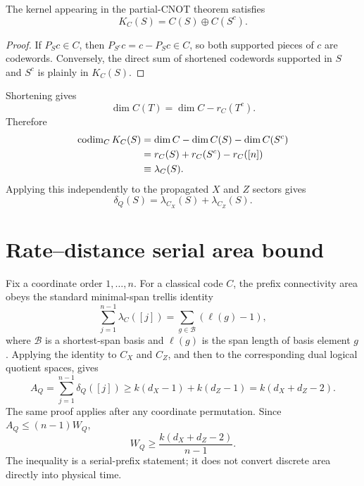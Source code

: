 \documentclass[aps,prx,preprint,superscriptaddress,nofootinbib,longbibliography]{revtex4-2}
\begin{document}
\begin{lemma}
The kernel appearing in the partial-CNOT theorem satisfies
\begin{equation}
K_C(S)=C(S)\oplus C(S^c).
\end{equation}
\end{lemma}
\begin{proof}
If $P_Sc\in C$, then $P_{S^c}c=c-P_Sc\in C$, so both supported pieces of $c$ are codewords. Conversely, the direct sum of shortened codewords supported in $S$ and $S^c$ is plainly in $K_C(S)$.
\end{proof}
Shortening gives
\begin{equation}
\dim C(T)=\dim C-r_C(T^c).
\end{equation}
Therefore
\begin{align}
\operatorname{codim}_CK_C(S)
&=\dim C-\dim C(S)-\dim C(S^c)\\
&=r_C(S)+r_C(S^c)-r_C([n])\\
&\equiv\lambda_C(S).
\end{align}
Applying this independently to the propagated $X$ and $Z$ sectors gives
\begin{equation}
\delta_Q(S)=\lambda_{C_X}(S)+\lambda_{C_Z}(S).
\end{equation}

\section{Rate--distance serial area bound}
Fix a coordinate order $1,\ldots,n$. For a classical code $C$, the prefix connectivity area obeys the standard minimal-span trellis identity
\begin{equation}
\sum_{j=1}^{n-1}\lambda_C([j])=\sum_{g\in\mathcal B}(\ell(g)-1),
\end{equation}
where $\mathcal B$ is a shortest-span basis and $\ell(g)$ is the span length of basis element $g$. Applying the identity to $C_X$ and $C_Z$, and then to the corresponding dual logical quotient spaces, gives
\begin{equation}
A_Q=\sum_{j=1}^{n-1}\delta_Q([j])\ge k(d_X-1)+k(d_Z-1)=k(d_X+d_Z-2).
\end{equation}
The same proof applies after any coordinate permutation. Since $A_Q\le(n-1)W_Q$,
\begin{equation}
W_Q\ge\frac{k(d_X+d_Z-2)}{n-1}.
\end{equation}
The inequality is a serial-prefix statement; it does not convert discrete area directly into physical time.
\end{document}
